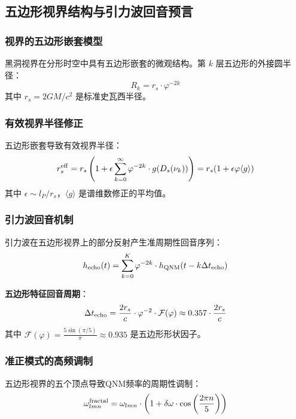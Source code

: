 \documentclass[12pt,a4paper,twocolumn]{article}
\renewcommand{\phi}{\varphi}
\begin{document}
\subsection{五边形视界结构与引力波回音预言}
\label{subsec:pentagon_horizon}

\subsubsection{视界的五边形嵌套模型}

黑洞视界在分形时空中具有五边形嵌套的微观结构。第 $k$ 层五边形的外接圆半径：
\begin{equation}
R_k = r_s \cdot \phi^{-2k}
\end{equation}
其中 $r_s = 2GM/c^2$ 是标准史瓦西半径。

\subsubsection{有效视界半径修正}

五边形嵌套导致有效视界半径：
\begin{equation}
r_s^{\rm eff} = r_s \left(1 + \epsilon \sum_{k=0}^{\infty}\phi^{-2k} \cdot g(D_s(\nu_k))\right) = r_s(1 + \epsilon\phi\langle g\rangle)
\end{equation}
其中 $\epsilon \sim l_P/r_s$，$\langle g\rangle$ 是谱维数修正的平均值。

\subsubsection{引力波回音机制}

引力波在五边形视界上的部分反射产生准周期性回音序列：
\begin{equation}
h_{\rm echo}(t) = \sum_{k=0}^{K} \phi^{-2k} \cdot h_{\rm QNM}(t - k\Delta t_{\rm echo})
\end{equation}

\textbf{五边形特征回音周期}：
\begin{equation}
\Delta t_{\rm echo} = \frac{2r_s}{c} \cdot \phi^{-2} \cdot \mathcal{F}(\phi) \approx 0.357 \cdot \frac{2r_s}{c}
\end{equation}
其中 $\mathcal{F}(\phi) = \frac{5\sin(\pi/5)}{\pi} \approx 0.935$ 是五边形形状因子。

\subsubsection{准正模式的高频调制}

五边形视界的五个顶点导致QNM频率的周期性调制：
\begin{equation}
\omega_{lmn}^{\rm fractal} = \omega_{lmn} \cdot \left(1 + \delta\omega \cdot \cos\left(\frac{2\pi n}{5}\right)\right)
\end{equation}
\end{document}

